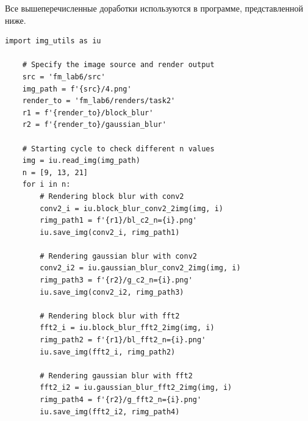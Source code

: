 \documentclass[a4paper, 12pt]{article}
\begin{document}
    Все вышеперечисленные доработки используются в программе, представленной ниже.
    \begin{lstlisting}[label=task22, caption={Реализация задания 2}]
    import img_utils as iu

    # Specify the image source and render output
    src = 'fm_lab6/src'
    img_path = f'{src}/4.png'
    render_to = 'fm_lab6/renders/task2'
    r1 = f'{render_to}/block_blur'
    r2 = f'{render_to}/gaussian_blur'

    # Starting cycle to check different n values
    img = iu.read_img(img_path)
    n = [9, 13, 21]
    for i in n:
        # Rendering block blur with conv2
        conv2_i = iu.block_blur_conv2_2img(img, i)
        rimg_path1 = f'{r1}/bl_c2_n={i}.png'
        iu.save_img(conv2_i, rimg_path1)

        # Rendering gaussian blur with conv2
        conv2_i2 = iu.gaussian_blur_conv2_2img(img, i)
        rimg_path3 = f'{r2}/g_c2_n={i}.png'
        iu.save_img(conv2_i2, rimg_path3)

        # Rendering block blur with fft2
        fft2_i = iu.block_blur_fft2_2img(img, i)
        rimg_path2 = f'{r1}/bl_fft2_n={i}.png'
        iu.save_img(fft2_i, rimg_path2)

        # Rendering gaussian blur with fft2
        fft2_i2 = iu.gaussian_blur_fft2_2img(img, i)
        rimg_path4 = f'{r2}/g_fft2_n={i}.png'
        iu.save_img(fft2_i2, rimg_path4)
    \end{lstlisting}
\end{document}
